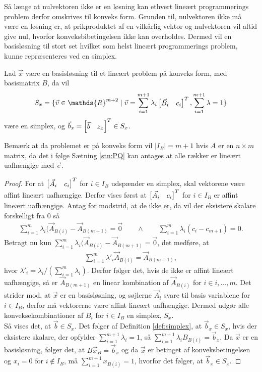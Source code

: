 Så længe at nulvektoren ikke er en løsning kan ethvert lineært programmerings problem derfor omskrives til konveks form.
Grunden til, nulvektoren ikke må være en løsning er, at prikproduktet af en vilkårlig vektor og nulvektoren vil altid give nul, hvorfor konveksbibetingelsen ikke kan overholdes.
Dermed vil en basisløsning til stort set hvilket som helst lineært programmerings problem, kunne repræsenteres ved en simplex.
\begin{stn}
Lad $\vec{x}$ være en basisløsning til et lineært problem på konveks form, med basismatrix $B$, da vil
\begin{align*}
S_x = \{\vec{v} \in \mathds{R}^{m+2} \mid \vec{v} = \sum_{i=1}^{m+1} \lambda_i \rvect{\vec{B}_i & c_i}^T, \sum_{i=1}^{m+1} \lambda = 1\}
\end{align*}
være en simplex, og $\vec{b}_x = \begin{bmatrix} \vec{b}& z_x \end{bmatrix}^T \in S_x$.
\end{stn}
Bemærk at da problemet er på konveks form vil $|I_B| = m+1$ hvis $A$ er en $n\times m$ matrix, da det i følge Sætning \ref{stn:PQ}
kan antages at alle rækker er lineært uafhængige med $\vec{e}$.
\begin{proof}
For at $\begin{bmatrix} \vec{A}_i & c_i \end{bmatrix}^T$ for $i \in I_B$ udspænder en simplex, skal vektorene være affint lineært uafhængige.
Derfor vises først at $\begin{bmatrix} \vec{A}_i & c_i \end{bmatrix}^T$ for $i \in I_B$ er affint lineært uafhængige.
Antag for modstrid, at de ikke er, da vil der eksistere skalare forskelligt fra $0$ så
\begin{align*}
\sum_{i = 1}^{m} \lambda_i (\vec{A}_{B(i)} - \vec{A}_{B(m+1)} =  \vec{0} \qquad \wedge \qquad \sum_{i=1}^{m} \lambda_i (c_i - c_{m+1})= 0.
\end{align*}
Betragt nu kun $\sum_{i = 1}^{m} \lambda_i (\vec{A}_{B(i)} - \vec{A}_{B(m+1)} =  \vec{0}$, det medføre, at
\begin{align*}
\sum_{i = 1}^{m} \lambda'_i \vec{A}_{B(i)} = \vec{A}_{B(m+1)},
\end{align*}
hvor $\lambda'_i = \lambda_i/(\sum_{i=1}^m \lambda_i)$.
Derfor følger det, hvis de ikke er affint lineært uafhængige, så er $\vec{A}_{B(m+1)}$ en linear kombination af $\vec{A}_{B(i)}$ for $i  \in i,..., m$.
Det strider mod, at $\vec{x}$ er en basisløsning, og søjlerne $\vec{A}_i$ svare til basis variablene for $i \in I_B$, derfor må vektorerne være affint lineært uafhængige. 
Dermed udgør alle konveksekombinationer af $B_i$ for $i \in I_B$ en simplex, $S_x$.
\\ Så vises det, at $\vec{b} \in S_x$. 
Det følger af Definition \ref{def:simplex},
at $\vec{b}_x\in S_x$, hvis der eksistere skalare, der opfylder $\sum_{i=1}^{m+1} \lambda_i = 1$, så $\sum_{i=1}^{m+1}\lambda_i B_{B(i)}  = \vec{b}_x$.
Da $\vec{x}$ er en basisløsning, følger det, at $B \vec{x}_B = \vec{b}_x$ og da $\vec{x}$ er betinget af konveksbetingelsen og $x_i = 0 $ for $i \notin I_B$, må $\sum_{i=1}^{m+1} x_{B(i)} = 1$, hvorfor det følger, at $\vec{b}_x \in S_x$.
\end{proof}
